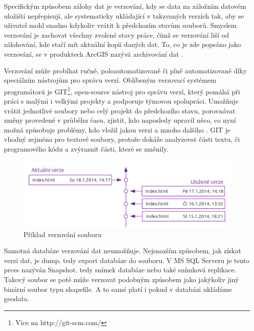         Specifickým způsobem zálohy dat je verzování, kdy se data na záložním datovém
        uložišti nepřepisují, ale systematicky ukládající v takzvaných verzích tak, aby
        se uživatel mohl snadno kdykoliv vrátit k předchozím stavům souborů. Smyslem
        verzování je zachovat všechny zvolené stavy práce, čímž se verzování liší od
        zálohování, kde stačí mít aktuální kopii daných dat. To, co je zde popsáno jako
        verzování, se v produktech ArcGIS nazývá archivování dat \citep{Law2008}. 

        Verzování může probíhat ručně, poloautomatizovaně či plně automatizovaně díky
        speciálním nástrojům pro správu verzí. Oblíbeným verzovací systémem
        programátorů je GIT\footnote{Více na http://git-scm.com/}, open-source nástroj
        pro správu verzí, který pomáhá při práci s malými i velkými projekty a
        podporuje týmovou spolupráci. Umožňuje vrátit jednotlivé soubory nebo celý
        projekt do předchozího stavu, porovnávat změny provedené v průběhu času,
        zjistit, kdo naposledy upravil něco, co nyní možná způsobuje problémy, kdo
        vložil jakou verzi a mnoho dalšího \citep{Chacon2009}. GIT je vhodný zejména
        pro textové soubory, protože dokáže analyzovat části textu, či programového
        kódu a zvýraznit části, které se změnily.
        
          \begin{figure}[H]
            \centering
            \includegraphics[scale=1]{../../../grafy/obr/schema_verzovani_maxiTence.png}
            \caption {Příklad verzování souboru}
          \end{figure}

        Samotná databáze verzování dat neumožňuje. Nejsnazším způsobem, jak získat
        verzi dat, je dump, tedy export databáze do souboru. V MS SQL Serveru je tento
        prces nazýván Snapshot, tedy snímek databáze nebo také snímková replikace.
        Takový soubor se poté může verzovat podobným způsobem jako jakýkoliv jiný
        binární soubor typu shapefile. A to samé platí i pokud v databázi ukládáme
        geodata. 


